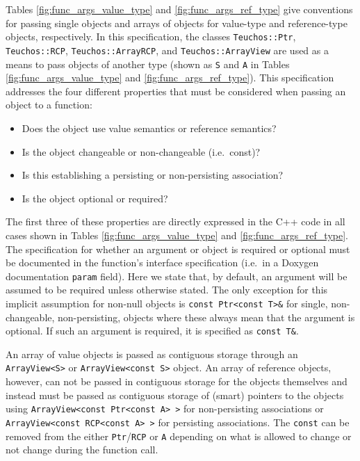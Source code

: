 Tables {}\ref{fig:func_args_value_type} and {}\ref{fig:func_args_ref_type}
give conventions for passing single objects and arrays of objects for
value-type {} and reference-type
{} objects, respectively.  In this specification,
the classes {}\texttt{Teuchos\-::Ptr}, {}\texttt{Teuchos\-::RCP},
{}\texttt{Teuchos\-::ArrayRCP}, and {}\texttt{Teuchos\-::ArrayView} are used
as a means to pass objects of another type (shown as {}\texttt{S} and
{}\texttt{A} in Tables {}\ref{fig:func_args_value_type} and
{}\ref{fig:func_args_ref_type}).  This specification addresses the four
different properties that must be considered when passing an object to a
function:

\begin{itemize}

{}\item Does the object use value semantics or reference semantics?

{}\item Is the object changeable or non-changeable (i.e.\ const)?

{}\item Is this establishing a persisting or non-persisting association?

{}\item Is the object optional or required?

\end{itemize}

The first three of these properties are directly expressed in the C++ code in
all cases shown in Tables {}\ref{fig:func_args_value_type} and
{}\ref{fig:func_args_ref_type}.  The specification for whether an argument or
object is required or optional must be documented in the function's interface
specification (i.e.\ in a Doxygen documentation {}\texttt{param} field).  Here
we state that, by default, an argument will be assumed to be required unless
otherwise stated.  The only exception for this implicit assumption for
non-null objects is {}\texttt{const Ptr<const T>\&} for single,
non-changeable, non-persisting, objects where these always mean that the
argument is optional.  If such an argument is required, it is specified as
{}\texttt{const T\&}.

An array of value objects is passed as contiguous storage through an
{}\texttt{ArrayView<S>} or {}\texttt{ArrayView<const S>} object.  An
array of reference objects, however, can not be passed in contiguous
storage for the objects themselves and instead must be passed as
contiguous storage of (smart) pointers to the objects using
{}\texttt{ArrayView<const Ptr<const A> >} for non-persisting
associations or {}\texttt{ArrayView<const RCP<const A> >} for
persisting associations.  The {}\texttt{const} can be removed from the
either {}\texttt{Ptr}/{}\texttt{RCP} or {}\texttt{A} depending on what
is allowed to change or not change during the function call.

